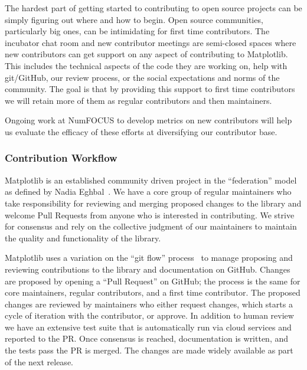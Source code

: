 \documentclass[12pt]{article}
\numberwithin{page}{section}
\begin{document}
The hardest part of getting started to contributing to open source
projects can be simply figuring out where and how to begin.  Open source communities,
particularly big ones, can be intimidating for first time
contributors.  The incubator chat room and new contributor meetings
are semi-closed spaces where  new
contributors can get support on any aspect of contributing to
Matplotlib.  This includes the technical aspects of the code they are
working on, help with git/GitHub, our review process, or the social
expectations and norms of the community.  The goal is that by
providing this support to first time contributors we will retain more
of them as regular contributors and then maintainers.


Ongoing work at NumFOCUS to develop metrics on new contributors
will help us evaluate the
efficacy of these efforts at diversifying our contributor base.

\subsubsection{Contribution Workflow}

Matplotlib is an established community driven project in the
``federation'' model as defined by Nadia Eghbal~\cite{eghbal_2020}.
We have a core group of regular maintainers who take responsibility for
reviewing and merging proposed changes to the library and welcome Pull
Requests from anyone who is interested in contributing.  We strive
for consensus and rely on the collective judgment of our maintainers
to maintain the quality and functionality of the library.

Matplotlib uses a variation on the ``git flow'' process~\cite{ghflow}
to manage proposing and reviewing contributions to the library and
documentation on GitHub.  Changes are proposed by opening a ``Pull
Request'' on GitHub; the process is the same for core maintainers,
regular contributors, and a first time contributor.  The proposed
changes are reviewed by maintainers who either request changes, which
starts a cycle of iteration with the contributor, or approve.  In
addition to human review we have an extensive test suite that is
automatically run via cloud services and reported to
the PR.  Once consensus is reached, documentation is written,
and the tests pass the PR is merged.  The changes are made widely available
as part of the next release.
\end{document}
